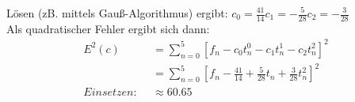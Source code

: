     Lösen (zB. mittels Gauß-Algorithmus) ergibt: $c_0 = \frac{41}{14} c_1 = -\frac{5}{28} c_2 = -\frac{3}{28}$ \\
    Als quadratischer Fehler ergibt sich dann:
    \begin{align*}
        E^2(c) &= \sum_{n=0}^{5} \left[ f_n - c_0 t_n^0 - c_1 t_n^1 - c_2 t_n^2 \right]^2 \\
               &= \sum_{n=0}^{5} \left[ f_n - \frac{41}{14} + \frac{5}{28} t_n + \frac{3}{28} t_n^2 \right]^2 \\
        \textit{Einsetzen: } \; &\approx 60.65 
    \end{align*}


